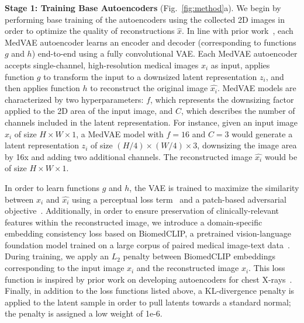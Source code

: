 \textbf{Stage 1: Training Base Autoencoders} (Fig.~\ref{fig:method}a). 
We begin by performing base training of the autoencoders using the collected 2D images in order to optimize the quality of reconstructions $\hat{x}$. In line with prior work~\cite{rombach2022high}, each MedVAE autoencoder learns an encoder and decoder (corresponding to functions $g$ and $h$) end-to-end using a fully convolutional VAE. Each MedVAE autoencoder accepts single-channel, high-resolution medical images $x_i$ as input, applies function $g$ to transform the input to a downsized latent representation $z_i$, and then applies function $h$ to reconstruct the original image $\hat{x_i}$. MedVAE models are characterized by two hyperparameters: $f$, which represents the downsizing factor applied to the 2D area of the input image, and $C$, which describes the number of channels included in the latent representation. For instance, given an input image $x_i$ of size $H \times W \times 1$, a MedVAE model with $f = 16$ and $C = 3$ would generate a latent representation $z_i$ of size $(H/4) \times (W/4) \times 3$, downsizing the image area by 16x and adding two additional channels. The reconstructed image $\hat{x_i}$ would be of size $H \times W \times 1$.

In order to learn functions $g$ and $h$, the VAE is trained to maximize the similarity between $x_i$ and $\hat{x_i}$ using a perceptual loss term~\cite{lpips} and a patch-based adversarial objective~\cite{isola2018patchgan}. Additionally, in order to ensure preservation of clinically-relevant features within the reconstructed image, we introduce a domain-specific embedding consistency loss based on BiomedCLIP, a pretrained vision-language foundation model trained on a large corpus of paired medical image-text data~\cite{zhang2023biomedclip}. During training, we apply an $L_2$ penalty between BiomedCLIP embeddings corresponding to the input image $x_i$ and the reconstructed image $\hat{x_i}$. This loss function is inspired by prior work on developing autoencoders for chest X-rays~\cite{lee2023llmcxr}. Finally, in addition to the loss functions listed above, a KL-divergence penalty is applied to the latent sample in order to pull latents towards a standard normal; the penalty is assigned a low weight of 1e-6. 

